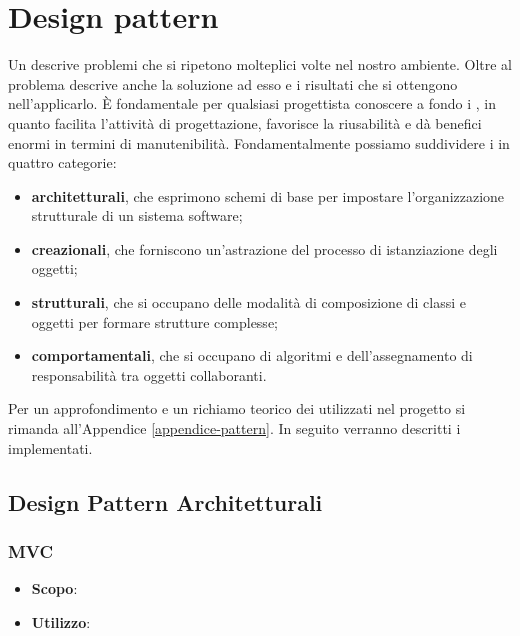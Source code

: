 \section{Design pattern}

Un  descrive problemi che si ripetono molteplici volte nel nostro ambiente. Oltre al problema descrive anche la soluzione ad esso e i risultati che si ottengono nell'applicarlo. È fondamentale per qualsiasi progettista conoscere a fondo i , in quanto facilita l'attività di progettazione, favorisce la riusabilità e dà benefici enormi in termini di manutenibilità. Fondamentalmente possiamo suddividere i  in quattro categorie:

\begin{itemize}

	\item \textbf{ architetturali}, che esprimono schemi di base per impostare l'organizzazione strutturale di un sistema software;
	\item \textbf{ creazionali}, che forniscono un'astrazione del processo di istanziazione degli oggetti;
	\item \textbf{ strutturali}, che si occupano delle modalità di composizione di classi e oggetti per formare strutture complesse; 
	\item \textbf{ comportamentali}, che si occupano di algoritmi e dell'assegnamento di responsabilità tra oggetti collaboranti.

\end{itemize}

Per un approfondimento e un richiamo teorico dei  utilizzati nel progetto  si rimanda all'Appendice \ref{appendice-pattern}. In seguito verranno descritti i  implementati.

\subsection{Design Pattern Architetturali}

\subsubsection{MVC}

\begin{itemize}

	\item \textbf{Scopo}:
	\item \textbf{Utilizzo}:
	
\end{itemize}

